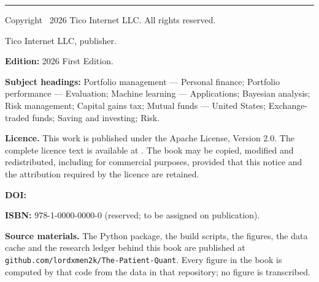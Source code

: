 \clearpage
\thispagestyle{plain}
\noindent{\sffamily\bfseries\color{txt}\bookTitle}\par
\noindent{\sffamily\small\color{txtdim}\bookSubtitle}\par
\vspace{14pt}
\noindent\rule{\textwidth}{0.4pt}\par
\vspace{10pt}
\noindent Copyright \textcopyright\ 2026 Tico Internet LLC. All rights
reserved.\par
\vspace{6pt}
\noindent Tico Internet LLC, publisher.\par
\vspace{10pt}
\noindent\textbf{Edition:} 2026 First Edition.\par
\vspace{6pt}
\noindent\textbf{Subject headings:} Portfolio management --- Personal
finance; Portfolio performance --- Evaluation; Machine learning ---
Applications; Bayesian analysis; Risk management; Capital gains tax;
Mutual funds --- United States; Exchange-traded funds; Saving and
investing; Risk.\par
\vspace{10pt}
\noindent\textbf{Licence.} This work is published under the Apache License,
Version 2.0. The complete licence text is available at
\href{https://www.apache.org/licenses/LICENSE-2.0}{}.
The book may be copied, modified and redistributed, including for commercial
purposes, provided that this notice and the attribution required by the
licence are retained.\par
\vspace{10pt}
\noindent\textbf{DOI:} \href{https://doi.org/\bookDOI}{\texttt{\bookDOI}}\par
\vspace{10pt}
\noindent\textbf{ISBN:} 978-1-0000-0000-0 (reserved; to be assigned on
publication).\par
\vspace{10pt}
\noindent\textbf{Source materials.} The Python package, the build scripts,
the figures, the data cache and the research ledger behind this book are
published at \texttt{github.com/lordxmen2k/The-Patient-Quant}. Every figure
in the book is computed by that code from the data in that repository; no
figure is transcribed.\par
\vspace{10pt}
